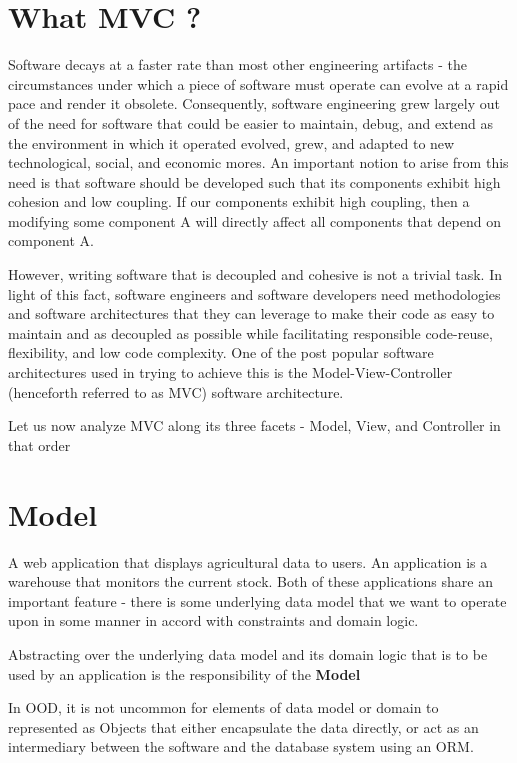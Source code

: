 
\section{What MVC ?}

Software decays at a faster rate than most other engineering artifacts - the circumstances under which a piece of software must operate can evolve at a rapid pace and render it obsolete. Consequently, software engineering grew largely out of the need for software that could be easier to maintain, debug, and extend as the environment in which it operated evolved, grew, and adapted to new technological, social, and economic mores. An important notion to arise from this need is that software should be developed such that its components exhibit high cohesion and low coupling. If our components exhibit high coupling, then a modifying some component A will directly affect all components that depend on component A.

However, writing software that is decoupled and cohesive is not a trivial task. In light of this fact, software engineers and software developers need methodologies and software architectures that they can leverage to make their code as easy to maintain and as decoupled as possible  while facilitating responsible code-reuse, flexibility, and low code complexity. One of the post popular software architectures used in trying to achieve this is the Model-View-Controller (henceforth referred to as MVC) software architecture.

Let us now analyze MVC along its three facets - Model, View, and Controller in that order

\section{Model}

A web application that displays agricultural data to users. An application is a warehouse that monitors the current stock. Both of these applications share an important feature - there is some underlying data model that we want to operate upon in some manner in accord with constraints and  domain logic. 

Abstracting over the underlying data model and its domain logic that is to be used by an application is the responsibility of the \textbf{Model}

In OOD, it is not uncommon for elements of data model or domain to represented as Objects that either encapsulate the data directly, or act as an intermediary between the software and the database system using an ORM.
